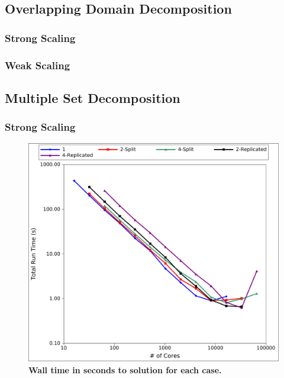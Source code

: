 \clearpage

\subsection{Overlapping Domain Decomposition}
\label{subsec:overlapping_domain_decomp}

\subsubsection{Strong Scaling}
\label{subsubsec:overlapping_strong}

\clearpage

\subsubsection{Weak Scaling}
\label{subsubsec:overlapping_weak}

\clearpage

\subsection{Multiple Set Decomposition}
\label{subsec:msod_decomposition}

\subsubsection{Strong Scaling}
\label{subsubsec:msod_strong}

\begin{figure}[t!]
  \begin{center}
    \includegraphics[width=6in]{chapters/parallel_mc/titan_strong_ms_time.pdf}
  \end{center}
  \caption{\textbf{Wall time in seconds to solution for each case.}}
  \label{fig:titan_strong_ms_time}
\end{figure}

